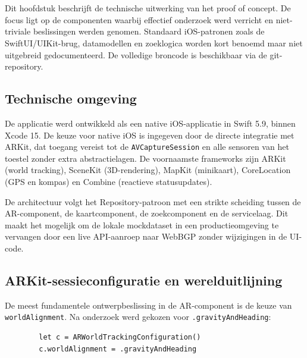 \chapter{}%
\label{ch:implementatie}

Dit hoofdstuk beschrijft de technische uitwerking van het proof of concept. De focus ligt op de componenten waarbij effectief onderzoek werd verricht en niet-triviale beslissingen werden genomen. Standaard iOS-patronen zoals de SwiftUI/UIKit-brug, datamodellen en zoeklogica worden kort benoemd maar niet uitgebreid gedocumenteerd. De volledige broncode is beschikbaar via de git-repository.

\section{Technische omgeving}

De applicatie werd ontwikkeld als een native iOS-applicatie in Swift 5.9, binnen Xcode 15. De keuze voor native iOS is ingegeven door de directe integratie met ARKit, dat toegang vereist tot de \texttt{AVCaptureSession} en alle sensoren van het toestel zonder extra abstractielagen. De voornaamste frameworks zijn ARKit (world tracking), SceneKit (3D-rendering), MapKit (minikaart), CoreLocation (GPS en kompas) en Combine (reactieve statusupdates).


De architectuur volgt het Repository-patroon met een strikte scheiding tussen de AR-component, de kaartcomponent, de zoekcomponent en de servicelaag. Dit maakt het mogelijk om de lokale mockdataset in een productieomgeving te vervangen door een live API-aanroep naar WebBGP zonder wijzigingen in de UI-code.

\section{ARKit-sessieconfiguratie en werelduitlijning}

De meest fundamentele ontwerpbeslissing in de AR-component is de keuze van \texttt{worldAlignment}. Na onderzoek werd gekozen voor \texttt{.gravityAndHeading}:

\begin{listing}[H]
    \begin{verbatim}
        let c = ARWorldTrackingConfiguration()
        c.worldAlignment = .gravityAndHeading
    \end{verbatim}
    \caption[ARKit werelduitlijning]{Configuratie van de ARKit-sessie met \texttt{.gravityAndHeading}.}
\end{listing}

